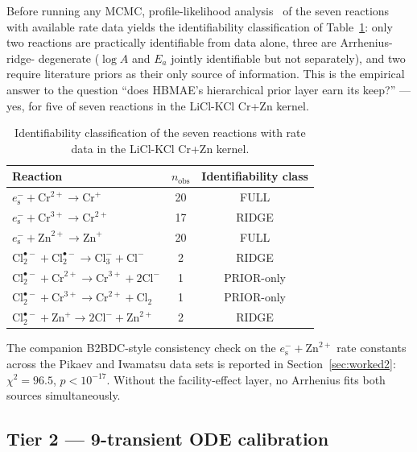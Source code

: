 \documentclass[12pt]{article}
\theoremstyle{plain}
\theoremstyle{definition}
\theoremstyle{remark}
\newcommand{\eS}{\ensuremath{e_{\mathrm{s}}^{-}}\xspace}
\newcommand{\Clt}{\ensuremath{\mathrm{Cl}_2^{\bullet-}}\xspace}
\newcommand{\HBMAE}{HBMAE\xspace}
\begin{document}
Before running any MCMC, profile-likelihood analysis~\citep{Raue2009} of
the seven reactions with available rate data yields the identifiability
classification of Table~\ref{tab:identifiability}:  only two reactions are
practically identifiable from data alone, three are Arrhenius-ridge-
degenerate ($\log A$ and $E_a$ jointly identifiable but not separately),
and two require literature priors as their only source of information.
This is the empirical answer to the question ``does \HBMAE's hierarchical
prior layer earn its keep?''  --- yes, for five of seven reactions in the
LiCl-KCl Cr+Zn kernel.

\begin{table}[ht]\centering
\caption{Identifiability classification of the seven reactions with rate data
in the LiCl-KCl Cr+Zn kernel.}
\label{tab:identifiability}
\small
\begin{tabular}{lcc}
\toprule
Reaction & $n_{\mathrm{obs}}$ & Identifiability class \\
\midrule
$\eS+\mathrm{Cr}^{2+} \to \mathrm{Cr}^+$ & 20 & FULL \\
$\eS+\mathrm{Cr}^{3+} \to \mathrm{Cr}^{2+}$ & 17 & RIDGE \\
$\eS+\mathrm{Zn}^{2+} \to \mathrm{Zn}^+$ & 20 & FULL \\
$\Clt+\Clt \to \mathrm{Cl}_3^- + \mathrm{Cl}^-$ & 2 & RIDGE \\
$\Clt+\mathrm{Cr}^{2+} \to \mathrm{Cr}^{3+}+2\mathrm{Cl}^-$ & 1 & PRIOR-only \\
$\Clt+\mathrm{Cr}^{3+} \to \mathrm{Cr}^{2+}+\mathrm{Cl}_2$ & 1 & PRIOR-only \\
$\Clt+\mathrm{Zn}^+ \to 2\mathrm{Cl}^- + \mathrm{Zn}^{2+}$ & 2 & RIDGE \\
\bottomrule
\end{tabular}
\end{table}

The companion B2BDC-style consistency check on the
$\eS+\mathrm{Zn}^{2+}$ rate constants across the Pikaev and Iwamatsu data
sets is reported in Section~\ref{sec:worked2}:  $\chi^2 = 96.5$,
$p < 10^{-17}$.  Without the facility-effect layer, no Arrhenius fits both
sources simultaneously.

\subsection{Tier 2 --- 9-transient ODE calibration}\label{sec:val:tier2}
\end{document}

